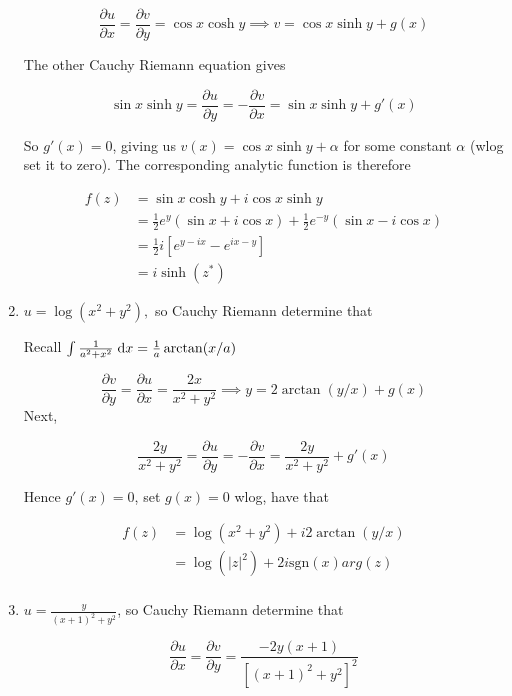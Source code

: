 \documentclass[a4paper]{article}
\begin{document}
\begin{enumerate}
	\[ \frac{\partial u }{\partial x} = \frac{\partial v }{\partial y} =   \cos x \cosh y\implies v = \cos x \sinh y + g(x) \]
	
	The other Cauchy Riemann equation gives
	
	\[ \sin x \sinh y = \frac{\partial u }{\partial y} = - \frac{\partial v }{\partial x} = \sin x \sinh y + g'(x) \]
	
	So $ g'(x) = 0 $, giving us $ v(x) = \cos x \sinh y + \alpha $ for some constant $ \alpha $ (wlog set it to zero). The corresponding analytic function is therefore
	
	
	\begin{align*}
	f(z) & = \sin x \cosh y  +  i \cos x \sinh y \\
	& = \frac{1}{2} e^{y} (\sin x + i \cos x) + \frac{1}{2} e^{-y} ( \sin x - i \cos x) \\
	& = \frac{1}{2} i [   e^{y - i x} - e^{ix - y} ] \\
	& = i \sinh (z^{*})
	\end{align*}
	
	
		
	\item $ u = \log(x^{2}+y^{2}), $ so Cauchy Riemann determine that
	
	Recall $ \int \frac{1}{a^{2} + x^{2}} \; \mathrm{d} x = \frac{1}{a} \arctan(x/a) $
	
	\[ \frac{\partial v }{\partial y} = \frac{\partial u }{\partial x } = \frac{2x}{x^{2}+y^{2}} \implies y = 2 \arctan (y/x) + g(x)   \]
	Next,
	
	\[ \frac{2y}{x^{2}+y^{2}}  = \frac{\partial u }{\partial y} = - \frac{\partial v}{\partial x} =  \frac{2y}{x^{2}+y^{2}} + g'(x) \]
		
	Hence $ g'(x) = 0 $, set $ g(x) = 0 $ wlog, have that 
	
	
	\begin{align*}
	f(z) & = \log(x^{2}+y^{2})  +  i 2 \arctan (y/x) \\
	& = \log(| z |^{2}) + 2 i \text{sgn}(x) arg(z) \\
	\end{align*}
	
	
	
	
		
	\item $ u = \frac{y}{(x+1)^{2} + y^{2}} $, so Cauchy Riemann determine that
	
	
		
	\[ \frac{\partial u }{\partial x} = \frac{\partial v }{\partial y} =   \frac{-2y(x+1)}{[(x+1)^{2} + y^{2}]^{2}}  \]
	

\end{enumerate}
\end{document}
